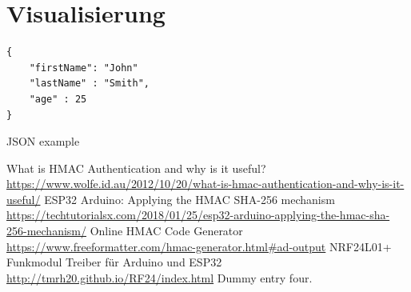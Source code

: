 \documentclass[
  10pt, %
  a4paper, %
  twoside, %
  openright, %
  numbers=noenddot, %
  BCOR=5mm, %
  parskip=half*, %
  thesis, %
]{bfhbook}
\begin{document}
\section{Visualisierung}
\begin{listing}
\begin{verbatim}
{     
    "firstName": "John"
    "lastName" : "Smith",
    "age" : 25
}
\end{verbatim}
\caption{JSON example} 
\label{json-example}
\end{listing}

\listoffigures
\listoftables
\printglossary
\begin{thebibliography}{99}
    What is HMAC Authentication and why is it useful? \url{https://www.wolfe.id.au/2012/10/20/what-is-hmac-authentication-and-why-is-it-useful/}
     ESP32 Arduino: Applying the HMAC SHA-256 mechanism \url{https://techtutorialsx.com/2018/01/25/esp32-arduino-applying-the-hmac-sha-256-mechanism/}
     Online HMAC Code Generator \url{https://www.freeformatter.com/hmac-generator.html#ad-output}
     NRF24L01+ Funkmodul Treiber für Arduino und ESP32 \url{http://tmrh20.github.io/RF24/index.html}
     Dummy entry four.
  \end{thebibliography}
\end{document}

